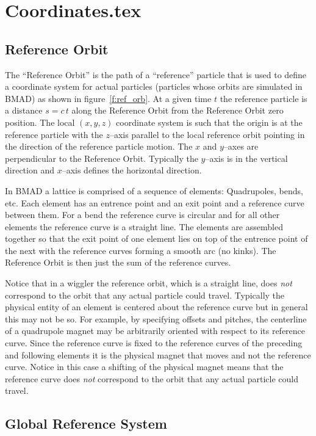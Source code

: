 \chapter{Coordinates.tex}

\section{Reference Orbit}

The ``Reference Orbit'' is the path of a ``reference'' particle that
is used to define a coordinate system for actual particles (particles
whose orbits are simulated in BMAD) as shown in
figure~\ref{f:ref_orb}. At a given time $t$ the reference particle is
a distance $s = c \, t$ along the Reference Orbit from the Reference
Orbit zero position. The local $(x, y, z)$ coordinate system is such
that the origin is at the reference particle with the $z$--axis
parallel to the local reference orbit pointing in the direction of the
reference particle motion. The $x$ and $y$--axes are perpendicular to
the Reference Orbit. Typically the $y$--axis is in the vertical
direction and $x$--axis defines the horizontal direction.

In BMAD a lattice is comprised of a sequence of elements: Quadrupoles,
bends, etc. Each element has an entrence point and an exit point and a
reference curve between them. For a bend the reference curve is
circular and for all other elements the reference curve is a straight
line. The elements are assembled together so that the exit point of
one element lies on top of the entrence point of the next with the
reference curves forming a smooth arc (no kinks). The Reference Orbit
is then just the sum of the reference curves. 

Notice that in a wiggler the reference orbit, which is a straight
line, does {\em not} correspond to the orbit that any actual particle
could travel. Typically the physical entity of an element is centered
about the reference curve but in general this may not be so. For
example, by specifying offsets and pitches, the centerline of a
quadrupole magnet may be arbitrarily oriented with respect to its
reference curve. Since the reference curve is fixed to the reference
curves of the preceding and following elements it is the physical
magnet that moves and not the reference curve. Notice in this case a
shifting of the physical magnet means that the reference curve does
{\em not} correspond to the orbit that any actual particle could
travel.


\section{Global Reference System}


